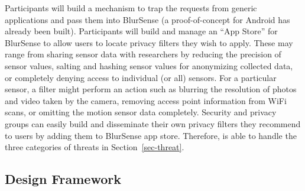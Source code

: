 Participants will build a mechanism to trap the requests from generic
applications and pass them into BlurSense (a proof-of-concept for 
Android has already been built). 
Participants will build and manage an ``App Store'' for BlurSense to allow 
users to locate privacy filters they wish to apply.   These may range from 
sharing sensor data with researchers by reducing
the precision of sensor values, salting and hashing sensor values for 
anonymizing collected data, or completely denying access to individual 
(or all) sensors. For a particular sensor, a filter might perform an action such
as blurring the resolution of photos and video taken by the camera, 
removing access point information from WiFi scans, or
omitting the motion sensor data completely.   Security and privacy groups can
easily build and disseminate their own privacy filters they recommend to users
by adding them to BlurSense app store. Therefore, \blurname is able to handle 
the three categories of threats in Section~\ref{sec-threat}. 

\subsection{Design Framework}